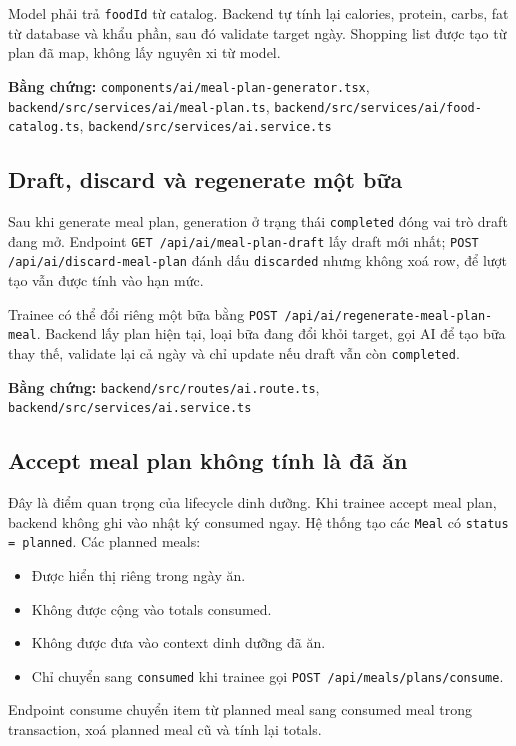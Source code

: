 \documentclass[12pt,a4paper]{article}
\newcommand{\code}[1]{\texttt{#1}}
\newcommand{\evidence}[1]{{\small\nolinkurl{#1}}}
\begin{document}
Model phải trả \code{foodId} từ catalog. Backend tự tính lại calories, protein, carbs, fat từ database và khẩu phần, sau đó validate target ngày. Shopping list được tạo từ plan đã map, không lấy nguyên xi từ model.

\textbf{Bằng chứng:} \evidence{components/ai/meal-plan-generator.tsx}, \evidence{backend/src/services/ai/meal-plan.ts}, \evidence{backend/src/services/ai/food-catalog.ts}, \evidence{backend/src/services/ai.service.ts}

\subsection{Draft, discard và regenerate một bữa}

Sau khi generate meal plan, generation ở trạng thái \code{completed} đóng vai trò draft đang mở. Endpoint \code{GET /api/ai/meal-plan-draft} lấy draft mới nhất; \code{POST /api/ai/discard-meal-plan} đánh dấu \code{discarded} nhưng không xoá row, để lượt tạo vẫn được tính vào hạn mức.

Trainee có thể đổi riêng một bữa bằng \code{POST /api/ai/regenerate-meal-plan-meal}. Backend lấy plan hiện tại, loại bữa đang đổi khỏi target, gọi AI để tạo bữa thay thế, validate lại cả ngày và chỉ update nếu draft vẫn còn \code{completed}.

\textbf{Bằng chứng:} \evidence{backend/src/routes/ai.route.ts}, \evidence{backend/src/services/ai.service.ts}

\subsection{Accept meal plan không tính là đã ăn}

Đây là điểm quan trọng của lifecycle dinh dưỡng. Khi trainee accept meal plan, backend không ghi vào nhật ký consumed ngay. Hệ thống tạo các \code{Meal} có \code{status = planned}. Các planned meals:

\begin{itemize}
  \item Được hiển thị riêng trong ngày ăn.
  \item Không được cộng vào totals consumed.
  \item Không được đưa vào context dinh dưỡng đã ăn.
  \item Chỉ chuyển sang \code{consumed} khi trainee gọi \code{POST /api/meals/plans/consume}.
\end{itemize}

Endpoint consume chuyển item từ planned meal sang consumed meal trong transaction, xoá planned meal cũ và tính lại totals.
\end{document}
